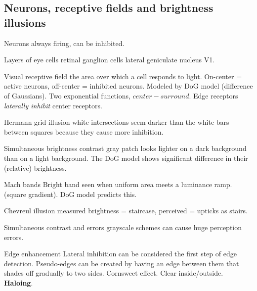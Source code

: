 \begin{mdframed}\begin{multicols}{2}

\subsection{Neurons, receptive fields and brightness illusions}
\begin{compactdesc}
    \item[Neurons] always firing, can be inhibited.
    \item[Layers of eye cells] \ce{->} retinal ganglion cells \ce{->} lateral
        geniculate nucleus \ce{->} V1.
    \item[Visual receptive field] the area over which a cell responds to light.
        On-center = active neurons, off-center = inhibited neurons. Modeled
        by DoG model (difference of Gaussians). Two exponential functions,
        $center - surround$. Edge receptors \emph{laterally inhibit} center
        receptors.
    \item{Hermann grid illusion} white intersections seem darker than the
        white bars between squares because they cause more inhibition.
    \item[Simultaneous brightness contrast] gray patch looks lighter
        on a dark background than on a light background. The DoG model
        shows significant difference in their (relative) brightness.
    \item[Mach bands] Bright band seen when uniform area meets a luminance
        ramp. (square gradient). DoG model predicts this.
    \item[Chevreul illusion] measured brightness = staircase, perceived =
        upticks as stairs.
    \item[Simultaneous contrast and errors] grayscale schemes can cause huge
        perception errors.
    \item[Edge enhancement] Lateral inhibition can be considered the first step
        of edge detection. Pseudo-edges can be created by having an
        edge between them that shades off gradually to two sides. Cornsweet
        effect. Clear inside/outside.
        \textbf{Haloing}.
\end{compactdesc}
\end{multicols}\end{mdframed}



